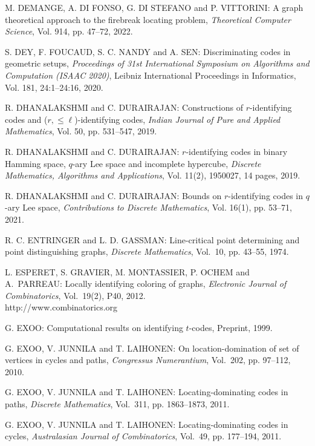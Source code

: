 \begin{thebibliography}{999}
M. DEMANGE, A. DI FONSO, G. DI STEFANO and P. VITTORINI: A graph theoretical approach to the firebreak locating problem, {\it Theoretical Computer Science}, Vol. 914, pp. 47--72, 2022.

S. DEY, F. FOUCAUD, S. C. NANDY and A. SEN: Discriminating codes in geometric setups, {\it Proceedings of 31st International Symposium on Algorithms and Computation (ISAAC 2020)}, Leibniz International Proceedings in Informatics, Vol. 181, 24:1--24:16, 2020.

R. DHANALAKSHMI and C. DURAIRAJAN: Constructions of $r$-identifying codes and ($r,\leq \ell$)-identifying codes, {\it Indian Journal of Pure and Applied Mathematics}, Vol. 50, pp. 531--547, 2019.

R. DHANALAKSHMI and C. DURAIRAJAN: $r$-identifying codes in binary Hamming space, $q$-ary Lee space and incomplete hypercube, {\it Discrete Mathematics, Algorithms and Applications}, Vol. 11(2), 1950027, 14 pages, 2019.

R. DHANALAKSHMI and C. DURAIRAJAN: Bounds on $r$-identifying codes in $q$-ary Lee space, {\it Contributions to Discrete Mathematics}, Vol. 16(1), pp. 53--71, 2021.

R. C. ENTRINGER and L. D. GASSMAN: Line-critical point determining and point distinguishing graphs, {\it Discrete Mathematics}, Vol.~10, pp. 43--55, 1974.

L. ESPERET, S. GRAVIER, M. MONTASSIER, P. OCHEM and A.~PARREAU: Locally identifying coloring of graphs, {\it Electronic Journal of Combinatorics}, Vol.~19(2), P40, 2012.\\
http://www.combinatorics.org

G. EXOO: Computational results on identifying $t$-codes, Preprint, 1999.

G. EXOO, V. JUNNILA and T. LAIHONEN: On location-domination of set of vertices in cycles and paths, %
{\it Congressus Numerantium}, Vol.~202, pp. 97--112, 2010.

G. EXOO, V. JUNNILA and T. LAIHONEN: Locating-dominating codes in paths, {\it Discrete Mathematics}, Vol.~311, pp. 1863--1873, 2011.

G. EXOO, V. JUNNILA and T. LAIHONEN: Locating-dominating codes in cycles, {\it Australasian Journal of Combinatorics}, Vol.~49, pp. 177--194, 2011.


\end{thebibliography}
